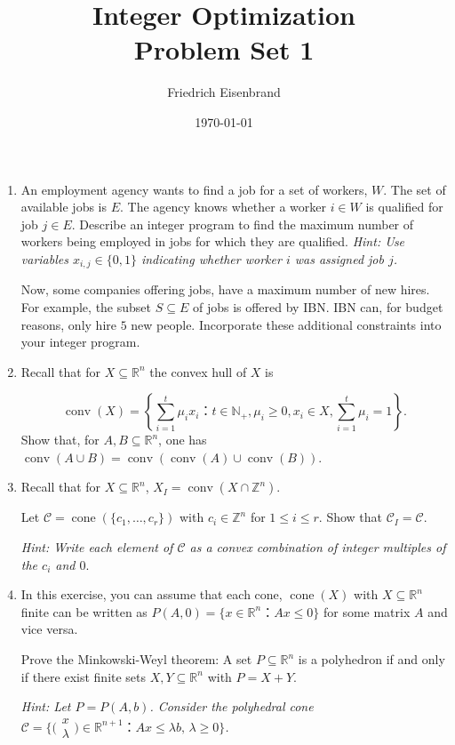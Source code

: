 \documentclass[11pt,a4paper]{article}
\title{Integer Optimization  \\ Problem Set 1 }
\author{ Friedrich Eisenbrand}
\date{\today}
\newcommand{\smat}[1]{ \big(\begin{smallmatrix} #1 \end{smallmatrix}\big)}
\DeclareMathOperator{\conv}{conv}
\DeclareMathOperator{\cone}{cone}
\begin{document}
\maketitle 




\begin{enumerate} 
\item An employment agency wants to find a job for a set of workers, $W$. The set of available jobs is $E$. The agency knows whether a worker $i ∈ W$ is qualified for job $j ∈ E$. Describe an integer program to find the maximum number of workers being employed in jobs for which they are qualified. \emph{Hint: Use variables $x_{i,j} ∈ \{0,1\}$ indicating whether worker $i$ was assigned job $j$.}

Now, some companies offering jobs, have a maximum number of new hires. For example, the subset $S⊆ E$ of jobs is offered by IBN. IBN can, for budget reasons, only hire $5$ new people. Incorporate these additional  constraints into your integer program. 
\item Recall that for $X ⊆ ℝ^n$ the convex hull of $X$ is

  \begin{displaymath}
      \conv(X) = \left\{ ∑_{i=1}^t μ_i x_i ： t ∈ ℕ_+, μ_i ≥0, x_i ∈ X, ∑_{i=1}^t μ_i =1 \right\}.
  \end{displaymath}
Show that, for $A,B ⊆ ℝ^n$, one has $\conv(A ∪B) = \conv\left( \conv(A) ∪ \conv(B) \right)$.  

\item
  Recall that for $X ⊆ ℝ^n$, $X_I = \conv( X ∩ ℤ^n)$. 
  
  Let $\mathscr{C} = \cone(\{c_1,\dots,c_r\})$ with $c_i ∈ℤ^n$ for $1≤i≤r$. Show that $\mathscr{C}_I = \mathscr{C}$.

  \emph{Hint: Write each element of $\mathscr{C}$ as a convex combination of integer multiples of the $c_i$ and $0$}.

\item In this exercise, you can assume that each cone, $\cone (X)$ with $X ⊆ℝ^n$ finite can be written as $P(A,0) = \{ x ∈ℝ^n ： Ax≤0\}$ for some matrix $A$ and vice versa.

  Prove the Minkowski-Weyl theorem: A set $P ⊆ ℝ^n$ is a polyhedron if and only if there exist finite sets $X,Y ⊆ ℝ^n$ with $P = X+Y$.

  \emph{Hint: Let $P = P(A,b)$. Consider the polyhedral cone $\mathscr{C} = \{ \smat{x\\λ} ∈ℝ^{n+1}  ：Ax ≤ λb, \, λ≥0 \}$. }


\end{enumerate}
\end{document}
